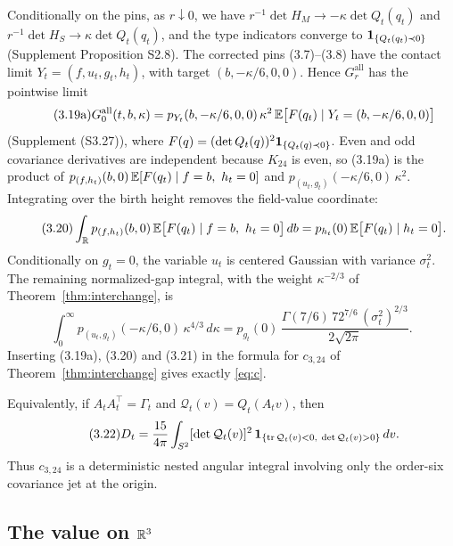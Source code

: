 Conditionally on the pins, as $r\downarrow0$, we have $r^{-1}\det H_M\to-\kappa\det Q_t(q_t)$ and $r^{-1}\det H_S\to\kappa\det Q_t(q_t)$, and the type indicators converge to $\mathbf 1_{\{Q_t(q_t)\prec0\}}$ (Supplement Proposition S2.8). The corrected pins (3.7)--(3.8) have the contact limit $Y_t=(f,u_t,g_t,h_t)$, with target $(b,-\kappa/6,0,0)$. Hence $G^{\mathrm{all}}_r$ has the pointwise limit
\begin{equation}\tag{3.19a}
G^{\mathrm{all}}_0(t,b,\kappa)=p_{Y_t}(b,-\kappa/6,0,0)\,\kappa^2\,\mathbb E\bigl[F(q_t)\mid Y_t=(b,-\kappa/6,0,0)\bigr]
\end{equation}
(Supplement (S3.27)), where $F(q)=(\det Q_t(q))^2\mathbf 1_{\{Q_t(q)\prec0\}}$. Even and odd covariance derivatives are independent because $K_{24}$ is even, so (3.19a) is the product of $p_{(f,h_t)}(b,0)\,\E[F(q_t)\mid f=b,\ h_t=0]$ and $p_{(u_t,g_t)}(-\kappa/6,0)\,\kappa^2$. Integrating over the birth height removes the field-value coordinate:
\begin{equation}\tag{3.20}
\int_{\R}p_{(f,h_t)}(b,0)\,\E\bigl[F(q_t)\mid f=b,\ h_t=0\bigr]\,db=p_{h_t}(0)\,\E\bigl[F(q_t)\mid h_t=0\bigr].
\end{equation}
Conditionally on $g_t=0$, the variable $u_t$ is centered Gaussian with variance $\sigma_t^2$. The remaining normalized-gap integral, with the weight $\kappa^{-2/3}$ of Theorem~\ref{thm:interchange}, is
\begin{equation}\tag{3.21}
\int_0^\infty p_{(u_t,g_t)}(-\kappa/6,0)\,\kappa^{4/3}\,d\kappa=p_{g_t}(0)\,\frac{\Gamma(7/6)\,72^{7/6}\,(\sigma_t^2)^{2/3}}{2\sqrt{2\pi}}.
\end{equation}
Inserting (3.19a), (3.20) and (3.21) in the formula for $c_{3,24}$ of Theorem~\ref{thm:interchange} gives exactly \eqref{eq:c}.

Equivalently, if $A_tA_t^{\top}=\Gamma_t$ and $\mathcal Q_t(v)=Q_t(A_tv)$, then
\begin{equation}\tag{3.22}
D_t=\frac{15}{4\pi}\int_{S^2}[\det\mathcal Q_t(v)]^2\,\mathbf 1_{\{\operatorname{tr}\mathcal Q_t(v)<0,\ \det\mathcal Q_t(v)>0\}}\,dv .
\end{equation}
Thus $c_{3,24}$ is a deterministic nested angular integral involving only the order-six covariance jet at the origin.

\subsection{The value on \texorpdfstring{$\mathbb R^3$}{R3}}\label{ssec:flat}

